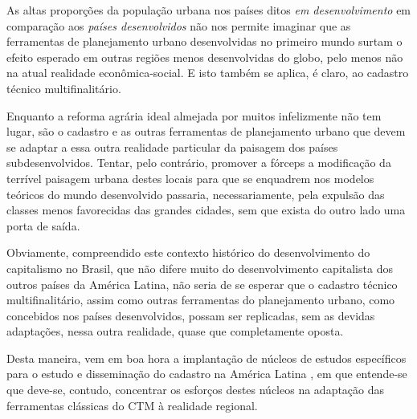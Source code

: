 \documentclass[
	12pt,				%
	oneside,			%
	a4paper,			%
	chapter=TITLE,		%
	section=TITLE,		%
	english,			%
	brazil				%
	]{abntex2}
\begin{document}
As altas proporções da população urbana nos países ditos \emph{em desenvolvimento} em
comparação aos \emph{países desenvolvidos} não nos permite imaginar que as
ferramentas de planejamento urbano desenvolvidas no primeiro mundo surtam o
efeito esperado em outras regiões menos desenvolvidas do globo, pelo menos não
na atual realidade econômica-social. E isto também se aplica, é claro, ao
cadastro técnico multifinalitário.

Enquanto a reforma agrária ideal almejada por muitos infelizmente não tem lugar,
são o cadastro e as outras ferramentas de planejamento urbano que devem se
adaptar a essa outra realidade particular da paisagem dos países
subdesenvolvidos. Tentar, pelo contrário, promover a fórceps a modificação da
terrível paisagem urbana destes locais para que se enquadrem nos modelos
teóricos do mundo desenvolvido passaria, necessariamente, pela expulsão das
classes menos favorecidas das grandes cidades, sem que exista do outro lado uma
porta de saída.

Obviamente, compreendido este contexto histórico do desenvolvimento do
capitalismo no Brasil, que não difere muito do desenvolvimento capitalista dos
outros países da América Latina, não seria de se esperar que o cadastro técnico
multifinalitário, assim como outras ferramentas do planejamento urbano, como
concebidos nos países desenvolvidos, possam ser replicadas, sem as devidas
adaptações, nessa outra realidade, quase que completamente oposta.

Desta maneira, vem em boa hora a implantação de núcleos de estudos específicos
para o estudo e disseminação do cadastro na América Latina \autocite{lalan}, em que
entende-se que deve-se, contudo, concentrar os esforços destes núcleos na
adaptação das ferramentas clássicas do CTM à realidade regional.
\end{document}
